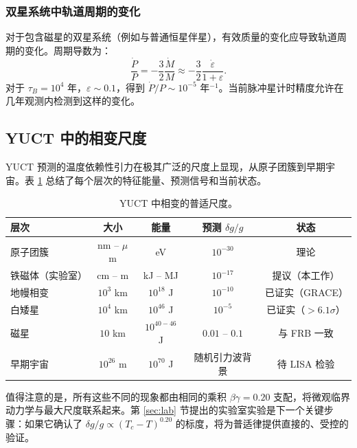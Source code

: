 \documentclass[12pt]{article}
\theoremstyle{remark}
\newcommand{\eps}{\varepsilon}
\begin{document}
	\subsubsection{双星系统中轨道周期的变化}
	\label{subsubsec:magnetars-binary}
	
	对于包含磁星的双星系统（例如与普通恒星伴星），有效质量的变化应导致轨道周期的变化。周期导数为：
	\begin{equation}
		\frac{\dot{P}}{P} = -\frac{3}{2} \frac{\dot{M}}{M} \approx -\frac{3}{2} \frac{\dot{\eps}}{1+\eps}.
		\label{eq:pdot}
	\end{equation}
	对于 $\tau_B = 10^4$ 年，$\eps \sim 0.1$，得到 $\dot{P}/P \sim 10^{-5}$ 年$^{-1}$。当前脉冲星计时精度允许在几年观测内检测到这样的变化。
	
	\subsection{YUCT 中的相变尺度}
	\label{subsec:scale}
	
	YUCT 预测的温度依赖性引力在极其广泛的尺度上显现，从原子团簇到早期宇宙。表 \ref{tab:scale} 总结了每个层次的特征能量、预测信号和当前状态。
	
	\begin{table}[htbp]
		\centering
		\caption{YUCT 中相变的普适尺度。}
		\label{tab:scale}
		\small
		\begin{tabular}{lcccc}
			\toprule
			\textbf{层次} & \textbf{大小} & \textbf{能量} & \textbf{预测 } \(\delta g/g\) & \textbf{状态} \\
			\midrule
			原子团簇 & nm – $\mu$m & eV & $10^{-30}$ & 理论 \\
			铁磁体（实验室） & cm – m & kJ – MJ & $10^{-17}$ & 提议（本工作） \\
			地幔相变 & $10^3$ km & $10^{18}$ J & $10^{-10}$ & 已证实（GRACE） \\
			白矮星 & $10^4$ km & $10^{46}$ J & $10^{-5}$ & 已证实（$>6.1\sigma$） \\
			磁星 & $10$ km & $10^{40-46}$ J & $0.01$ – $0.1$ & 与 FRB 一致 \\
			早期宇宙 & $10^{26}$ m & $10^{70}$ J & 随机引力波背景 & 待 LISA 检验 \\
			\bottomrule
		\end{tabular}
	\end{table}
	
	值得注意的是，所有这些不同的现象都由相同的乘积 $\beta\gamma = 0.20$ 支配，将微观临界动力学与最大尺度联系起来。第 \ref{sec:lab} 节提出的实验室实验是下一个关键步骤：如果它确认了 $\delta g/g \propto (T_c - T)^{0.20}$ 的标度，将为普适律提供直接的、受控的验证。
	
\end{document}
